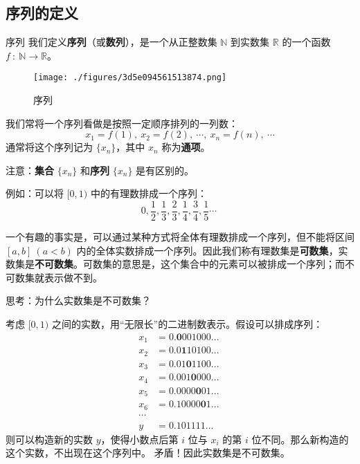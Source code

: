 
\begin{issues}
\issueTODO
\issueDraft
\end{issues}

\subsection{序列的定义}
\begin{definition}{序列}
我们定义\textbf{序列}（或\textbf{数列}），是一个从正整数集 $\mathbb{N}$  到实数集 $\mathbb{R}$ 的一个函数 $f\ :\ \mathbb{N}\rightarrow \mathbb{R}$。
\end{definition}
\begin{figure}[ht]
\centering
\texttt{[image: ./figures/3d5e094561513874.png]}
\caption{序列} \label{fig_seq_1}
\end{figure}
我们常将一个序列看做是按照一定顺序排列的一列数：
$$
x_1=f(1),\ x_2=f(2),\ \cdots,\ x_n=f(n),\ \cdots
$$
通常将这个序列记为 $\{x_n\}$，其中 $x_n$ 称为\textbf{通项}。

注意：\textbf{集合} $\{x_n\}$ 和\textbf{序列} $\{x_n\}$ 是有区别的。

例如：可以将 $[0,1)$ 中的有理数排成一个序列：
$$
0,\frac{1}{2},\frac{1}{3},\frac{2}{3},\frac{1}{4},\frac{3}{4},\frac{1}{5}\cdots~
$$

一个有趣的事实是，可以通过某种方式将全体有理数排成一个序列，但不能将区间 $[a,b]\ (a<b)$ 内的全体实数排成一个序列。因此我们称有理数集是\textbf{可数集}，实数集是\textbf{不可数集}。可数集的意思是，这个集合中的元素可以被排成一个序列；而不可数集就表示做不到。

\begin{example}{}
思考：为什么实数集是不可数集？

考虑 $[0,1)$ 之间的实数，用“无限长”的二进制数表示。假设可以排成序列： 
\begin{equation}
\begin{aligned}
x_1&=0.\boldsymbol 0001000...\\
x_2&=0.0\boldsymbol 110100...\\
x_3&=0.01\boldsymbol 01100...\\
x_4&=0.001\boldsymbol 0000...\\
x_5&=0.0000\boldsymbol 001...\\
x_6&=0.10000\boldsymbol 01...\\
\cdots
\\
y&=0.101111...
\end{aligned}~
\end{equation}
则可以构造新的实数 $y$，使得小数点后第 $i$ 位与 $x_i$ 的第 $i$ 位不同。那么新构造的这个实数，不出现在这个序列中。
矛盾！因此实数集是不可数集。
\end{example}

​		

​		
